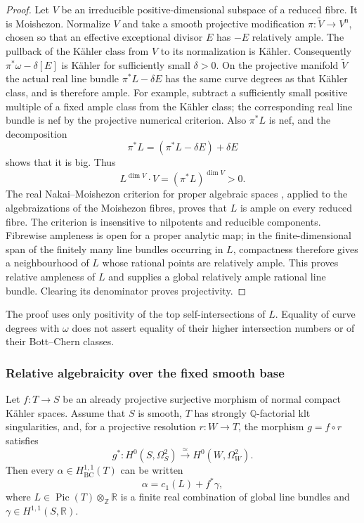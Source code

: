 \begin{proof}
Let $V$ be an irreducible positive-dimensional subspace of a reduced
fibre. It is Moishezon. Normalize $V$ and take a smooth projective
modification $\pi:\widetilde V\to V^{\mathrm n}$, chosen so that
an effective exceptional divisor $E$ has $-E$ relatively ample.
The pullback of the K\"ahler class from $V$ to its normalization is
K\"ahler. Consequently
$\pi^*\omega-\delta[E]$ is K\"ahler for sufficiently small
$\delta>0$. On the projective manifold $\widetilde V$ the actual
real line bundle $\pi^*L-\delta E$ has the same curve degrees as
that K\"ahler class, and is therefore ample. For example, subtract
a sufficiently small positive multiple of a fixed ample class from
the K\"ahler class; the corresponding real line bundle is nef by
the projective numerical criterion. Also $\pi^*L$ is nef, and the
decomposition
\[
 \pi^*L=(\pi^*L-\delta E)+\delta E
\]
shows that it is big. Thus
\[
 L^{\dim V}\cdot V=(\pi^*L)^{\dim V}>0.
\]
The real Nakai--Moishezon criterion for proper algebraic spaces
\cite[Theorem~1.6]{FujinoMiyamoto2020}, applied to the algebraizations
of the Moishezon fibres, proves that $L$ is ample on every reduced
fibre. The criterion is insensitive to nilpotents and reducible
components. Fibrewise ampleness is open for a proper analytic map;
in the finite-dimensional span of the finitely many line bundles
occurring in $L$, compactness therefore gives a neighbourhood of
$L$ whose rational points are relatively ample. This proves relative
ampleness of $L$ and supplies a global relatively ample rational
line bundle. Clearing its denominator proves projectivity.
\end{proof}

\begin{remark}
The proof uses only positivity of the top self-intersections of
$L$. Equality of curve degrees with $\omega$ does not assert
equality of their higher intersection numbers or of their
Bott--Chern classes.
\end{remark}



\subsubsection{Relative algebraicity over the fixed smooth base}
\label{repair:sec:fixed-smooth-base-algebraicity}

\begin{lemma}
\label{repair:lem:fixed-smooth-base-algebraicity}
Let $f:T\to S$ be an already projective surjective morphism of normal
compact K\"ahler spaces. Assume that $S$ is smooth, $T$ has strongly
$\mathbb{Q}$-factorial klt singularities, and, for a projective resolution
$r:W\to T$, the morphism $g=f\circ r$ satisfies
\[
 g^*:H^0(S,\Omega_S^2)\xrightarrow{\ \simeq\ }
                         H^0(W,\Omega_W^2).
\]
Then every $\alpha\in H^{1,1}_{\mathrm{BC}}(T)$ can be written
\[
                         \alpha=c_1(L)+f^*\gamma,
\]
where $L\in\operatorname{Pic}(T)\otimes_{\mathbb Z}\mathbb R$ is a
finite real combination of global line bundles and
$\gamma\in H^{1,1}(S,\mathbb R)$.
\end{lemma}

